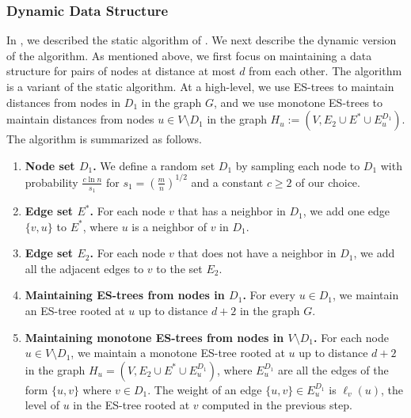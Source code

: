 \documentclass[11pt]{article}
\theoremstyle{definition}
\theoremstyle{remark}
\begin{document}
\subsubsection{Dynamic Data Structure} 
In , we described the static algorithm of \cite{DHZ00}. We next describe the dynamic version of the algorithm. As mentioned above, we first focus on maintaining a data structure for pairs of nodes at distance at most $d$ from each other. The algorithm is a variant of the static algorithm. At a high-level, we use ES-trees to maintain distances from nodes in $D_1$ in the graph $G$, and we use monotone ES-trees to maintain distances from nodes $u \in V \setminus D_1$ in the graph $H_u:=(V, E_2 \cup E^* \cup E^{D_1}_u)$. 
The algorithm is summarized as follows.

\begin{enumerate}
    \item \textbf{Node set $D_1$.} We define a random set $D_1$ by sampling each node to $D_1$ with probability $\frac{c\ln{n}}{s_1}$ for $s_1= (\frac{m}{n})^{1/2}$ and a constant $c \geq 2$ of our choice.
    \item \textbf{Edge set $E^*$.} For each node $v$ that has a neighbor in $D_1$, we add one edge $\{v,u\}$ to $E^*$, where $u$ is a neighbor of $v$ in $D_1$.
    \item \textbf{Edge set $E_2$.} For each node $v$ that does not have a neighbor in $D_1$, we add all the adjacent edges to $v$ to the set $E_2$.
    \item \textbf{Maintaining ES-trees from nodes in $D_1$.} For every $u \in D_1$, we maintain an ES-tree rooted at $u$ up to distance $d+2$ in the graph $G$.
    \item \textbf{Maintaining monotone ES-trees from nodes in $V \setminus D_1$.} For each node $u \in V \setminus D_1$, we maintain a monotone ES-tree rooted at $u$ up to distance $d+2$ in the graph $H_u = (V,E_2 \cup E^* \cup E_u^{D_1})$, where $E_u^{D_1}$ are all the edges of the form $\{u,v\}$ where $v \in D_1$. The weight of an edge $\{u,v\} \in E_u^{D_1}$ is $\ell_v(u)$, the level of $u$ in the ES-tree rooted at $v$ computed in the previous step.
\end{enumerate}

\end{document}
